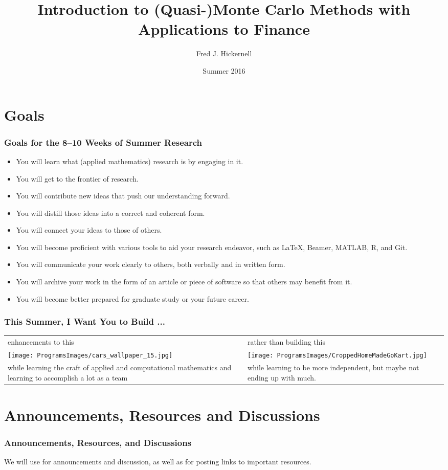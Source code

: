 \documentclass[10pt,compress,xcolor={usenames,dvipsnames},CJK]{beamer}
\title[(Quasi-)Monte Carlo \& Finance]{Introduction to (Quasi-)Monte Carlo Methods with \\ Applications to Finance}
\author{Fred J. Hickernell}
\institute{Department of Applied Mathematics,  Illinois Institute of Technology \\
\href{mailto:hickernell@iit.edu}{\nolinkurl{hickernell@iit.edu}} \quad
\href{http://mypages.iit.edu/~hickernell}{\nolinkurl{mypages.iit.edu/~hickernell}}}
\date{Summer 2016}
\begin{document}
\frame{\titlepage}

\section{Goals}
\begin{frame}\frametitle{Goals for the 8--10 Weeks of Summer Research}
\begin{itemize}
\item You will learn what (applied mathematics) research is by engaging in it.
\item You will get to the frontier of research.
\item You will contribute new ideas that push our understanding forward.
\item You will distill those ideas into a correct and coherent form.
\item You will connect your ideas to those of others.
\item You will become proficient with various tools to aid your research endeavor, such as \LaTeX, Beamer, MATLAB, R, and Git.
\item You will communicate your work clearly to others, both verbally and in written form.
\item You will archive your work in the form of an article or piece of software so that others may benefit from it.
\item You will become better prepared for graduate study or your future career.
\end{itemize}
\end{frame}

\begin{frame}
\frametitle{This Summer, I Want You to Build ...}
\begin{tabular}{>{\centering}m{5.5cm}>{\centering}m{5.5cm}}
enhancements to this &
rather than building this \tabularnewline
\texttt{[image: ProgramsImages/cars\_wallpaper\_15.jpg]} &
\texttt{[image: ProgramsImages/CroppedHomeMadeGoKart.jpg]} \tabularnewline
while learning the craft of applied and computational mathematics and learning to accomplish a lot as a team & while learning to be more independent, but maybe not ending up with much.
\end{tabular}
\end{frame}




\section{Announcements, Resources and Discussions}
\begin{frame}
\frametitle{Announcements, Resources, and Discussions}

We will use   for announcements and discussion, as well as for posting links to important resources.

\end{frame}
\end{document}
